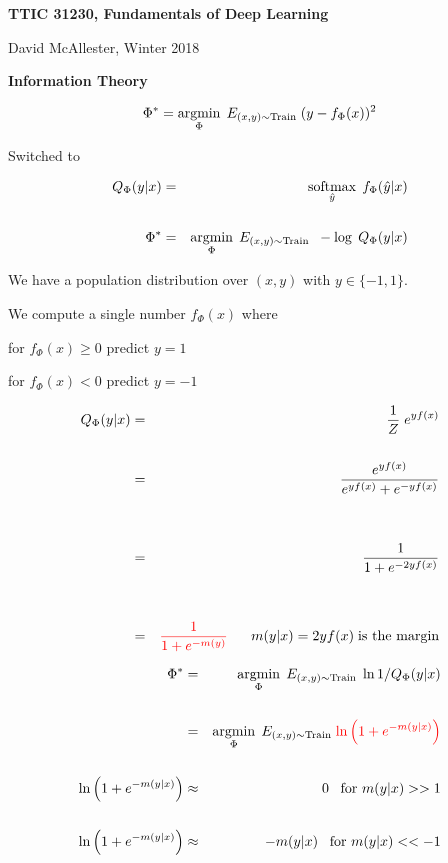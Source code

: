 



{\Huge

  \centerline{\bf TTIC 31230, Fundamentals of Deep Learning}
  \bigskip
  \centerline{David McAllester, Winter 2018}

  \vfill
  \centerline{\bf Information Theory} 
  \vfill
\vfill
\vfill



$$\Phi^* = \operatorname*{argmin}_\Phi \;E_{(x,y) \sim \mathrm{Train}} \;(y-f_\Phi(x))^2$$

\vfill
Switched to

\vfill
\begin{eqnarray*}
  Q_\Phi(y|x) & = & \operatorname*{softmax}_{\hat{y}}\;f_\Phi(\hat{y}|x) \\
  \\
  \Phi^* & = & \operatorname*{argmin}_\Phi\;E_{(x,y) \sim \mathrm{Train}}\;\; - \log\;Q_\Phi(y|x)
\end{eqnarray*}



We have a population distribution over $(x,y)$ with $y \in \{-1,1\}$.

\vfill
We compute a single number $f_\Phi(x)$ where

\vfill
for $f_\Phi(x) \geq 0$ predict $y = 1$

\vfill
for $f_\Phi(x) < 0$ predict $y = -1$


\begin{eqnarray*}
  Q_\Phi(y|x) & = & \frac{1}{Z} \;e^{yf(x)} \\
  \\
  & = & \frac{e^{yf(x)}}{e^{yf(x)} + e^{-yf(x)}} \\
  \\
  \\
  & = & \frac{1}{1 + e^{-2yf(x)}} \\
  \\
  \\
    & = & {\color{red} \frac{1}{1 + e^{-m(y)}}} \;\;\;\;\;\;m(y|x) = 2yf(x)\;\mbox{is the margin}
\end{eqnarray*}


\begin{eqnarray*}
  \Phi^* & = & \operatorname*{argmin}_\Phi\;E_{(x,y) \sim \mathrm{Train}}\;\ln 1/Q_\Phi(y|x) \\
  \\
  & = & \operatorname*{argmin}_\Phi\;E_{(x,y) \sim \mathrm{Train}}\;{\color{red} \ln \left(1 + e^{-m(y|x)}\right)} \\
  \\
  \ln \left(1 + e^{-m(y|x)}\right) & \approx & 0 \;\;\;\mbox{for $m(y|x) >> 1$} \\
  \\
  \ln \left(1 + e^{-m(y|x)}\right) & \approx & -m(y|x) \;\;\;\mbox{for $m(y|x) << -1$} \\
\end{eqnarray*}

}
